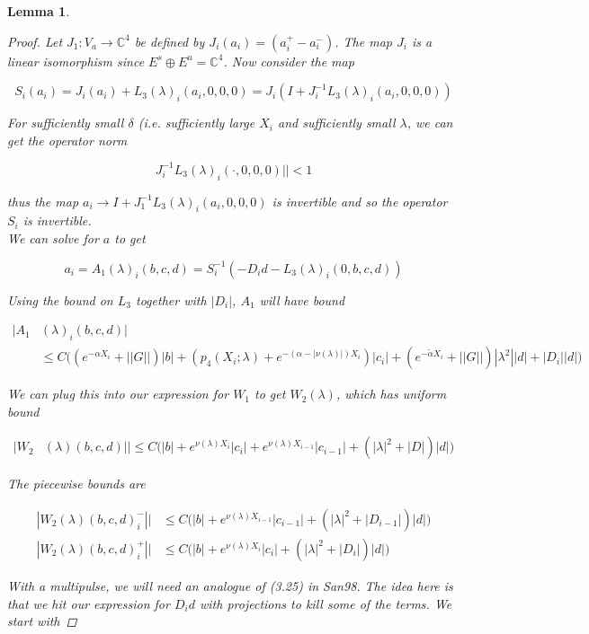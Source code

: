 \documentclass[12pt]{article}
\def\C{{\mathbb C}}
\newtheorem{lemma}{Lemma}
\begin{document}
\begin{lemma}
\begin{proof}
Let $J_1: V_a \rightarrow \C^4$ be defined by $J_i(a_i) = (a_i^+ - a_i^-)$. The map $J_i$ is a linear isomorphism since $E^s \oplus E^u = \C^4$. Now consider the map

\[
S_i(a_i) = J_i (a_i) + L_3(\lambda)_i(a_i, 0, 0, 0) = J_i( I + J_i^{-1} L_3(\lambda)_i(a_i, 0, 0, 0))
\]

For sufficiently small $\delta$ (i.e. sufficiently large $X_i$ and sufficiently small $\lambda$, we can get the operator norm 

\[
J_i^{-1} L_3(\lambda)_i(\cdot, 0, 0, 0)|| < 1
\]

thus the map $a_i \rightarrow I + J_1^{-1} L_3(\lambda)_i(a_i, 0, 0, 0)$ is invertible and so the operator $S_i$ is invertible.\\

We can solve for $a$ to get

\[
a_i = A_1(\lambda)_i(b, c, d) = S_i^{-1}(-D_i d - L_3(\lambda)_i(0, b, c, d))
\]

Using the bound on $L_3$ together with $|D_i|$, $A_1$ will have bound

\begin{align*}
|A_1&(\lambda)_i(b, c, d)| \\
&\leq C \Big( (e^{-\alpha X_i} + ||G||) |b| + ( p_4(X_i; \lambda) + e^{-(\alpha - |\nu(\lambda)|)X_i} )|c_i|
+ (e^{-\tilde{\alpha} X_i} + ||G||) |\lambda^2| |d| + |D_i||d| \Big)
\end{align*} 

We can plug this into our expression for $W_1$ to get $W_2(\lambda)$, which has uniform bound

\begin{align*}
|W_2&(\lambda)(b,c,d)|| 
\leq C \Big( |b| + e^{\nu(\lambda)X_i}|c_i| + e^{\nu(\lambda)X_{i-1}}|c_{i-1}| + (|\lambda|^2 + |D|)|d| \Big)
\end{align*}

The piecewise bounds are

\begin{align*}
|W_2(\lambda)(b,c,d)_i^-|| 
&\leq C \Big( |b| + e^{\nu(\lambda)X_{i-1}}|c_{i-1}| + (|\lambda|^2 + |D_{i-1}|)|d| \Big) \\
|W_2(\lambda)(b,c,d)_i^+|| 
&\leq C \Big( |b| + e^{\nu(\lambda)X_i}|c_i| + (|\lambda|^2 + |D_i|)|d| \Big)
\end{align*}

With a multipulse, we will need an analogue of (3.25) in San98. The idea here is that we hit our expression for $D_i d$ with projections to kill some of the terms. We start with


\end{proof}
\end{lemma}
\end{document}
